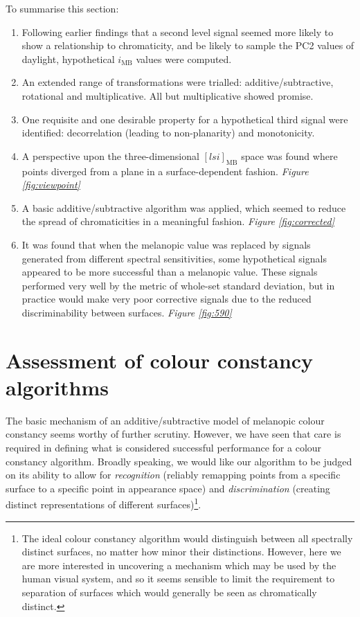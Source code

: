 \bigskip
\noindent
To summarise this section:
\begin{enumerate}
    \item Following earlier findings that a second level signal seemed more likely to show a relationship to chromaticity, and be likely to sample the \gls{PC2} values of daylight, hypothetical $i_{\text{MB}}$ values were computed.
    \item An extended range of transformations were trialled: additive/subtractive, rotational and multiplicative. All but multiplicative showed promise.
    \item One requisite and one desirable property for a hypothetical third signal were identified: decorrelation (leading to non-planarity) and monotonicity. 
    \item A perspective upon the three-dimensional $[lsi]_{\text{MB}}$ space was found where points diverged from a plane in a surface-dependent fashion. \emph{Figure \ref{fig:viewpoint}}
    \item A basic additive/subtractive algorithm was applied, which seemed to reduce the spread of chromaticities in a meaningful fashion. \emph{Figure \ref{fig:corrected}} 
    \item It was found that when the melanopic value was replaced by signals generated from different spectral sensitivities, some hypothetical signals appeared to be more successful than a melanopic value. These signals performed very well by the metric of whole-set standard deviation, but in practice would make very poor corrective signals due to the reduced discriminability between surfaces. \emph{Figure \ref{fig:590}}
\end{enumerate}

\clearpage




\section{Assessment of colour constancy algorithms}

The basic mechanism of an additive/subtractive model of melanopic colour constancy seems worthy of further scrutiny. However, we have seen that care is required in defining what is considered successful performance for a colour constancy algorithm. Broadly speaking, we would like our algorithm to be judged on its ability to allow for \emph{recognition} (reliably remapping points from a specific surface to a specific point in appearance space) and \emph{discrimination} (creating distinct representations of different surfaces)\footnote{The ideal colour constancy algorithm would distinguish between all spectrally distinct surfaces, no matter how minor their distinctions. However, here we are more interested in uncovering a mechanism which may be used by the human visual system, and so it seems sensible to limit the requirement to separation of surfaces which would generally be seen as chromatically distinct.}.

